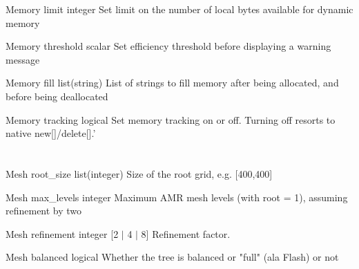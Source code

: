 \documentclass{book}
\begin{document}
\Parameter
{Memory}
{}
{limit}
{integer}
{}
{Set limit on the number of local bytes available for dynamic memory}
{}
{}

\Parameter
{Memory}
{}
{threshold}
{scalar}
{}
{Set efficiency threshold before displaying a warning message}
{}
{}

\Parameter
{Memory}
{}
{fill}
{list(string)}
{}
{List of strings to fill memory after being allocated, and before being deallocated}
{}
{}

\Parameter
{Memory}
{}
{tracking}
{logical}
{}
{Set memory tracking on or off. Turning off resorts to native new[]/delete[].'}
{}
{}

\section{}

\Parameter
{Mesh}
{}
{root\_size}
{list(integer)}
{}
{Size of the root grid, e.g. [400,400]}
{}
{}

\Parameter
{Mesh}
{}
{max\_levels}
{integer}
{}
{Maximum AMR mesh levels (with root = 1), assuming refinement by two}
{}
{}

\Parameter
{Mesh}
{}
{refinement}
{integer}
{[2 $|$ 4 $|$ 8]}
{Refinement factor.}
{}
{}

\Parameter
{Mesh}
{}
{balanced}
{logical}
{}
{Whether the tree is balanced or "full" (ala Flash) or not}
{}
{}
\end{document}
